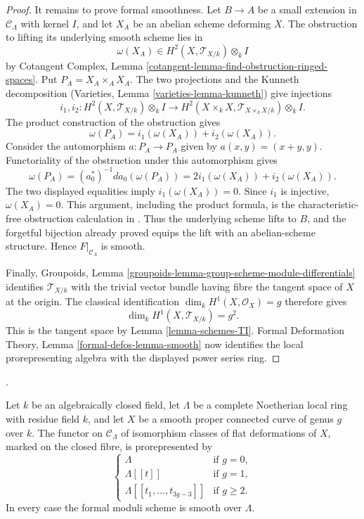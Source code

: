 \begin{proof}
It remains to prove formal smoothness. Let $B \to A$ be a small extension in
$\mathcal{C}_\Lambda$ with kernel $I$, and let $X_A$ be an abelian scheme
deforming $X$. The obstruction to lifting its underlying smooth scheme lies
in
$$
\omega(X_A) \in H^2(X, \mathcal{T}_{X/k}) \otimes_k I
$$
by Cotangent Complex, Lemma
\ref{cotangent-lemma-find-obstruction-ringed-spaces}. Put
$P_A = X_A \times_A X_A$. The two projections and the Kunneth decomposition
(Varieties, Lemma \ref{varieties-lemma-kunneth}) give injections
$$
i_1, i_2 : H^2(X, \mathcal{T}_{X/k}) \otimes_k I
\longrightarrow H^2(X \times_k X, \mathcal{T}_{X \times_k X/k}) \otimes_k I.
$$
The product construction of the obstruction gives
$$
\omega(P_A) = i_1(\omega(X_A)) + i_2(\omega(X_A)).
$$
Consider the automorphism $a : P_A \to P_A$ given by
$a(x, y) = (x + y, y)$. Functoriality of the obstruction under this
automorphism gives
$$
\omega(P_A) = (a_0^*)^{-1}d a_0(\omega(P_A))
= 2i_1(\omega(X_A)) + i_2(\omega(X_A)).
$$
The two displayed equalities imply $i_1(\omega(X_A)) = 0$. Since $i_1$ is
injective, $\omega(X_A) = 0$. This argument, including the product formula,
is the characteristic-free obstruction calculation in
\cite[pp. 279--280]{Oort-local-moduli}. Thus the underlying scheme lifts to
$B$, and the forgetful bijection already proved equips the lift with an
abelian-scheme structure. Hence $F|_{\mathcal{C}_\Lambda}$ is smooth.

Finally, Groupoids, Lemma
\ref{groupoids-lemma-group-scheme-module-differentials} identifies
$\mathcal{T}_{X/k}$ with the trivial vector bundle having fibre the tangent
space of $X$ at the origin. The classical identification
$\dim_k H^1(X, \mathcal{O}_X) = g$ therefore gives
$$
\dim_k H^1(X, \mathcal{T}_{X/k}) = g^2.
$$
This is the tangent space by Lemma \ref{lemma-schemes-TI}. Formal Deformation
Theory, Lemma \ref{formal-defos-lemma-smooth} now identifies the local
prorepresenting algebra with the displayed power series ring.
\end{proof}

\begin{lemma}
\label{lemma-smooth-proper-curve-formal-moduli-dimension}
\begin{reference}
\cite[Expos\'e 195, C, remarks following Proposition 4.1, p. 386]{FGA}.
\end{reference}
Let $k$ be an algebraically closed field, let $\Lambda$ be a complete
Noetherian local ring with residue field $k$, and let $X$ be a smooth proper
connected curve of genus $g$ over $k$. The functor on
$\mathcal{C}_\Lambda$ of isomorphism classes of flat deformations of $X$,
marked on the closed fibre, is prorepresented by
$$
\begin{cases}
\Lambda & \text{if } g = 0,\\
\Lambda[[t]] & \text{if } g = 1,\\
\Lambda[[t_1, \ldots, t_{3g - 3}]] & \text{if } g \geq 2.
\end{cases}
$$
In every case the formal moduli scheme is smooth over $\Lambda$.
\end{lemma}

